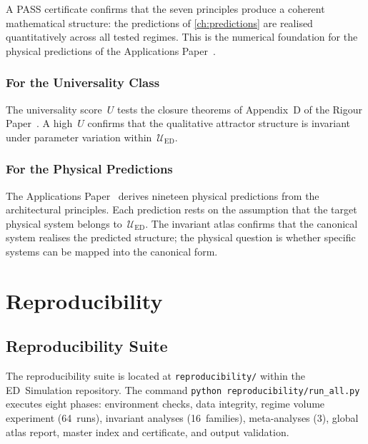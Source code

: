 \documentclass[11pt,twoside,openright]{book}
\theoremstyle{definition}
\theoremstyle{plain}
\theoremstyle{definition}
\theoremstyle{remark}
\newcommand{\UED}{\mathcal{U}_{\mathrm{ED}}}
\begin{document}
A PASS certificate confirms that the seven principles produce a coherent mathematical structure: the predictions of \cref{ch:predictions} are realised quantitatively across all tested regimes. This is the numerical foundation for the physical predictions of the Applications Paper~\cite{applications}.

\section{For the Universality Class}

The universality score~\(U\) tests the closure theorems of Appendix~D of the Rigour Paper~\cite{rigour}. A high~\(U\) confirms that the qualitative attractor structure is invariant under parameter variation within~\(\UED\).

\section{For the Physical Predictions}

The Applications Paper~\cite{applications} derives nineteen physical predictions from the architectural principles. Each prediction rests on the assumption that the target physical system belongs to~\(\UED\). The invariant atlas confirms that the canonical system realises the predicted structure; the physical question is whether specific systems can be mapped into the canonical form.


\part{Reproducibility}\label{part:reproducibility}

\chapter{Reproducibility Suite}\label{ch:repro-suite}

The reproducibility suite is located at \texttt{reproducibility/} within the ED~Simulation repository. The command \texttt{python reproducibility/run\_all.py} executes eight phases: environment checks, data integrity, regime volume experiment (64~runs), invariant analyses (16~families), meta-analyses (3), global atlas report, master index and certificate, and output validation.
\end{document}
